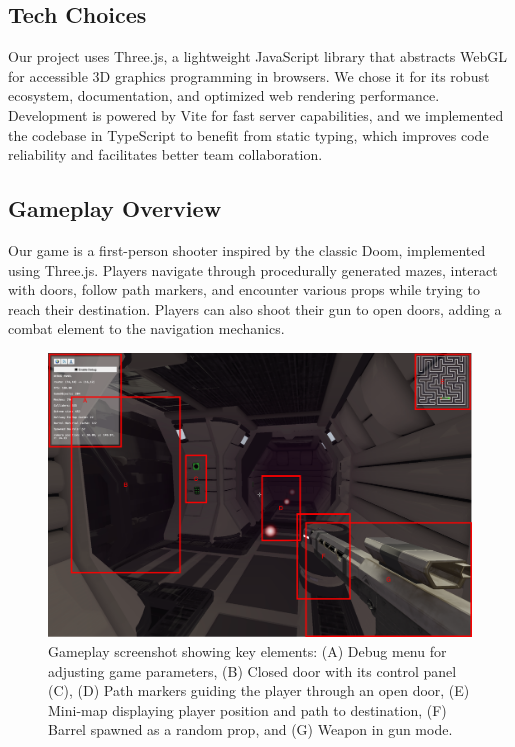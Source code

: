 \documentclass{article}
\begin{document}
\subsection{Tech Choices}
Our project uses Three.js, a lightweight JavaScript library that abstracts WebGL for accessible 3D graphics programming in browsers. We chose it for its robust ecosystem, documentation, and optimized web rendering performance. Development is powered by Vite for fast server capabilities, and we implemented the codebase in TypeScript to benefit from static typing, which improves code reliability and facilitates better team collaboration.

\subsection{Gameplay Overview}
Our game is a first-person shooter inspired by the classic Doom, implemented using Three.js. Players navigate through procedurally generated mazes, interact with doors, follow path markers, and encounter various props while trying to reach their destination. Players can also shoot their gun to open doors, adding a combat element to the navigation mechanics.

\begin{figure}[H]
    \centering
    \includegraphics[width=\textwidth]{diagrams/screenshot.png}
    \caption{Gameplay screenshot showing key elements: (A) Debug menu for adjusting game parameters, (B) Closed door with its control panel (C), (D) Path markers guiding the player through an open door, (E) Mini-map displaying player position and path to destination, (F) Barrel spawned as a random prop, and (G) Weapon in gun mode.}
    \label{fig:gameplay-overview}
\end{figure}
\end{document}
